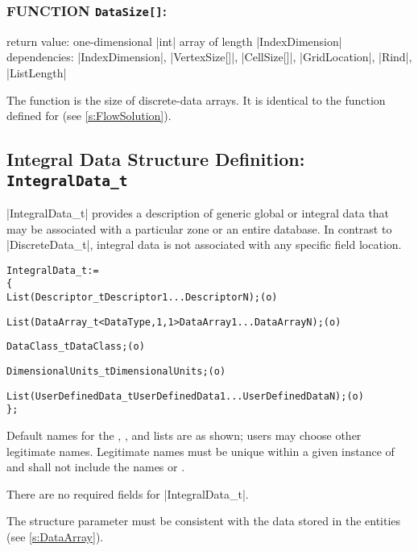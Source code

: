 \subsubsection*{FUNCTION \texttt{DataSize[]}:}

\noindent return value: one-dimensional |int| array of length
          |IndexDimension| \\
\noindent dependencies: |IndexDimension|, |VertexSize[]|, |CellSize[]|,
          |GridLocation|, |Rind|, |ListLength|

The function  is the size of discrete-data arrays.
It is identical to the function  defined for
 (see \autoref{s:FlowSolution}).

\subsection{Integral Data Structure Definition: \texttt{IntegralData\_t}} 
\label{s:IntegralData}

|IntegralData_t| provides a description of generic global or integral data
that may be associated with a particular zone or an entire database.
In contrast to |DiscreteData_t|, integral data is not associated with
any specific field location.
\begin{alltt}
  IntegralData\_t :=
    \{
    List( Descriptor\_t Descriptor1 ... DescriptorN ) ;                      (o)

    List( DataArray\_t<DataType, 1, 1> DataArray1 ... DataArrayN ) ;         (o)

    DataClass\_t DataClass ;                                                 (o)
    
    DimensionalUnits\_t DimensionalUnits ;                                   (o)

    List( UserDefinedData\_t UserDefinedData1 ... UserDefinedDataN ) ;       (o)
    \} ;
\end{alltt}

\begin{notes}
\item
 Default names for the , , and
 lists are as shown; users may choose other legitimate names.
 Legitimate names must be unique within a given instance of
  and shall not include the names 
 or .
\item
 There are no required fields for |IntegralData_t|.  
\item
 The structure parameter  must be consistent with the
 data stored in the  entities (see \autoref{s:DataArray}).
\end{notes}

